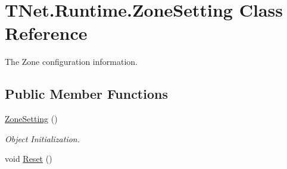 \hypertarget{class_t_net_1_1_runtime_1_1_zone_setting}{}\section{T\+Net.\+Runtime.\+Zone\+Setting Class Reference}
\label{class_t_net_1_1_runtime_1_1_zone_setting}


The Zone configuration information.  


\subsection*{Public Member Functions}
\begin{DoxyCompactItemize}
\item 
\mbox{\hyperlink{class_t_net_1_1_runtime_1_1_zone_setting_ae00e4ecc2f4b67b3a09828d975ed2641}{Zone\+Setting}} ()
\begin{DoxyCompactList}\small\item\em Object Initialization. \end{DoxyCompactList}\item 
void \mbox{\hyperlink{class_t_net_1_1_runtime_1_1_zone_setting_ac6add18611763781b3d038ed488818d0}{Reset}} ()
\end{DoxyCompactItemize}
